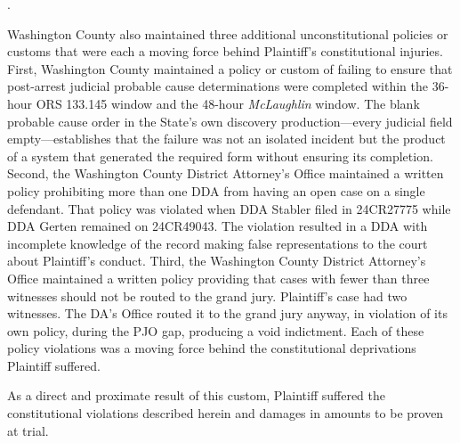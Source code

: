 \documentclass[12pt,letterpaper]{article}
\newcounter{complaintpara}
\newenvironment{paras}{%
	\begin{list}{\arabic{complaintpara}.}{%
			\setlength{\leftmargin}{0.5in}%
			\setlength{\labelwidth}{0.4in}%
			\setlength{\labelsep}{0.1in}%
			\setlength{\itemsep}{0pt}%
			\setlength{\parsep}{0pt}%
			\setlength{\topsep}{6pt}%
		}%
	}{%
	\end{list}%
}
\begin{document}
\begin{paras}
		\item Washington County also maintained three additional unconstitutional policies or customs that were each a moving force behind Plaintiff's constitutional injuries. First, Washington County maintained a policy or custom of failing to ensure that post-arrest judicial probable cause determinations were completed within the 36-hour ORS 133.145 window and the 48-hour \textit{McLaughlin} window. The blank probable cause order in the State's own discovery production---every judicial field empty---establishes that the failure was not an isolated incident but the product of a system that generated the required form without ensuring its completion. Second, the Washington County District Attorney's Office maintained a written policy prohibiting more than one DDA from having an open case on a single defendant. That policy was violated when DDA Stabler filed in 24CR27775 while DDA Gerten remained on 24CR49043. The violation resulted in a DDA with incomplete knowledge of the record making false representations to the court about Plaintiff's conduct. Third, the Washington County District Attorney's Office maintained a written policy providing that cases with fewer than three witnesses should not be routed to the grand jury. Plaintiff's case had two witnesses. The DA's Office routed it to the grand jury anyway, in violation of its own policy, during the PJO gap, producing a void indictment. Each of these policy violations was a moving force behind the constitutional deprivations Plaintiff suffered.
		\item As a direct and proximate result of this custom,
		Plaintiff suffered the constitutional violations described
		herein and damages in amounts to be proven at trial.
		
	\end{paras}
\end{document}
